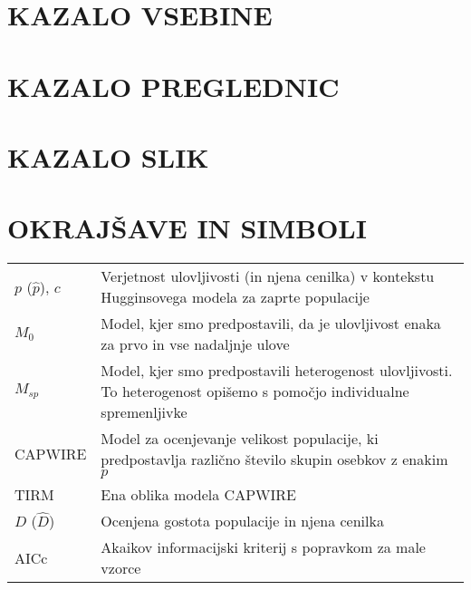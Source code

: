 \begin{table}[H]
\begin{tabular}{>{\raggedright} p{2cm} m{12.5cm}}
  \end{tabular}
\end{table}

\newpage

\renewcommand*{\contentsname}{}
\section*{\textbf{\large KAZALO VSEBINE}}
\vspace{-1.8cm}
\renewcommand{\baselinestretch}{0.8}\normalsize
\tableofcontents
\renewcommand{\baselinestretch}{1.0}\normalsize

\newpage
\normalsize
\renewcommand*\listtablename{}
\section*{\textbf{KAZALO PREGLEDNIC}}
\vspace{-1.5cm}
\listoftables

\newpage
\normalsize
\renewcommand*\listfigurename{} %
\section*{\textbf{KAZALO SLIK}} %
\vspace{-1cm}
\listoffigures

\newpage
\section*{OKRAJŠAVE IN SIMBOLI}

\begin{table}[H]
 \begin{tabular}{>{\raggedright} p{2cm} m{12cm}}
   $p$ ($\hat{p}$), $c$ & Verjetnost ulovljivosti (in njena cenilka) v kontekstu Hugginsovega modela za zaprte populacije \\
   $M_0$ & Model, kjer smo predpostavili, da je ulovljivost enaka za prvo in vse nadaljnje ulove \\
   $M_{sp}$ & Model, kjer smo predpostavili heterogenost ulovljivosti. To heterogenost opišemo s pomočjo individualne spremenljivke \\
   CAPWIRE & Model za ocenjevanje velikost populacije, ki predpostavlja različno število skupin osebkov z enakim $p$ \\
   TIRM & Ena oblika modela CAPWIRE \\
   $D$ ($\hat{D}$) & Ocenjena gostota populacije in njena cenilka \\
   AICc & Akaikov informacijski kriterij s popravkom za male vzorce \\
 \end{tabular}
\end{table}
\normalsize
